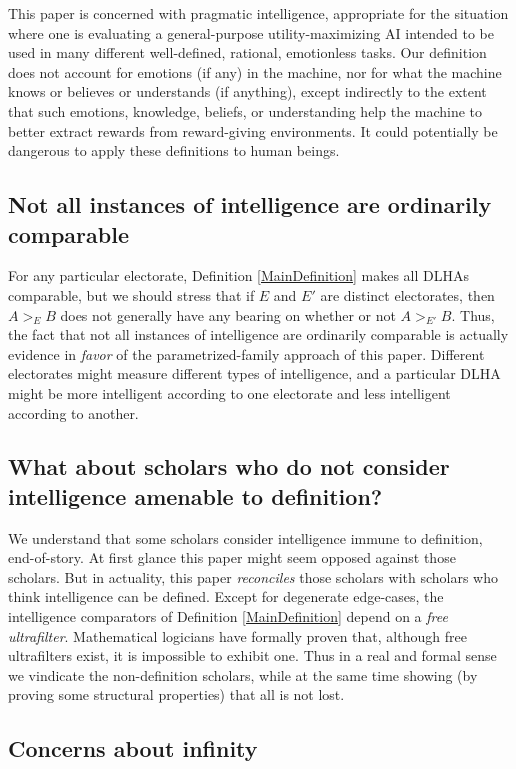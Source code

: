 \documentclass[twoside,11pt]{article}
\begin{document}
This paper is concerned with pragmatic intelligence, appropriate for the situation where one
is evaluating a general-purpose utility-maximizing AI intended to be used in many different
well-defined, rational, emotionless tasks. Our definition does not account for
emotions (if any) in the machine, nor for what the machine knows or believes
or understands (if anything), except indirectly to the extent that such emotions,
knowledge, beliefs, or understanding help the machine to better extract rewards
from reward-giving environments.
It could potentially be dangerous to apply these definitions to human beings.

\subsection{Not all instances of intelligence are ordinarily comparable}

For any particular electorate, Definition \ref{MainDefinition} makes all
DLHAs comparable, but we should stress that if $E$ and $E'$ are distinct
electorates, then $A>_EB$ does not generally have any bearing on whether
or not $A>_{E'}B$. Thus, the fact that not all instances of intelligence
are ordinarily comparable is actually evidence in \emph{favor} of the
parametrized-family approach of this paper. Different electorates might
measure different types of intelligence, and a particular DLHA might
be more intelligent according to one electorate and less intelligent
according to another.

\subsection{What about scholars who do not consider intelligence amenable to definition?}

We understand that some scholars consider intelligence immune to
definition, end-of-story. At first glance this paper
might seem opposed against those
scholars. But in actuality, this paper \emph{reconciles} those
scholars with scholars who think intelligence can be defined.
Except for degenerate edge-cases, the intelligence comparators of
Definition \ref{MainDefinition} depend on a \emph{free ultrafilter}.
Mathematical logicians have formally proven that, although free ultrafilters
exist, it is impossible to exhibit one. Thus in a real and
formal sense we vindicate the non-definition scholars, while at the same
time showing (by proving some structural properties) that
all is not lost.

\subsection{Concerns about infinity}
\end{document}
